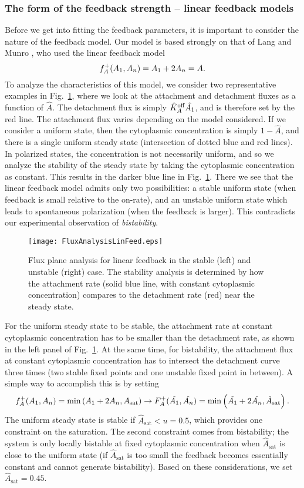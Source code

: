 \documentclass[11pt]{article}
\newcommand{\6}[1]{#1_{\text{6}}}
\newcommand{\3}[1]{#1_{\text{3}}}
\begin{document}
\subsubsection{The form of the feedback strength -- linear feedback models}
Before we get into fitting the feedback parameters, it is important to consider the nature of the feedback model. Our model is based strongly on that of Lang and Munro \cite{lang2022oligomerization}, who used the linear feedback model $$f_A^+(A_1,A_n)=A_1+2A_n=A.$$ 
To analyze the characteristics of this model, we consider two representative examples in Fig.\ \ref{fig:P3Linear}, where we look at the attachment and detachment fluxes as a function of $\hat A$. The detachment flux is simply $\hat{K}^\text{off}_A \hat {A_1}$, and is therefore set by the red line. The attachment flux varies depending on the model considered. If we consider a uniform state, then the cytoplasmic concentration is simply $1-\hat A$, and there is a single uniform steady state (intersection of dotted blue and red lines). In polarized states, the concentration is not necessarily uniform, and so we analyze the stability of the steady state by taking the cytoplasmic concentration as constant. This results in the darker blue line in Fig.\ \ref{fig:P3Linear}. There we see that the linear feedback model admits only two possibilities: a stable uniform state (when feedback is small relative to the on-rate), and an unstable uniform state which leads to spontaneous polarization (when the feedback is larger). This contradicts our experimental observation of \emph{bistability}.

\begin{figure}
\centering
\texttt{[image: FluxAnalysisLinFeed.eps]}
\caption{\label{fig:P3Linear}Flux plane analysis for linear feedback in the stable (left) and unstable (right) case. The stability analysis is determined by how the attachment rate (solid blue line, with constant cytoplasmic concentration) compares to the detachment rate (red) near the steady state.}
\end{figure}

For the uniform steady state to be stable, the attachment rate at constant cytoplasmic concentration has to be smaller than the detachment rate, as shown in the left panel of Fig.\ \ref{fig:P3Linear}. At the same time, for bistability, the attachment flux at constant cytoplasmic concentration has to intersect the detachment curve three times (two stable fixed points and one unstable fixed point in between). A simple way to accomplish this is by setting
\begin{equation}
f_A^+(A_1,A_n) =\min\left(A_1+2A_n,A_\text{sat}\right) \rightarrow F_A^+(\hat {A_1}, \hat {A_n}) = \min\left(\hat {A_1}+2\hat {A_n}, \hat A_\text{sat}\right). 
\end{equation}
The uniform steady state is stable if $\hat A_\text{sat} < u = 0.5$, which provides one constraint on the saturation. The second constraint comes from bistability; the system is only locally bistable at fixed cytoplasmic concentration when $\hat A_\text{sat}$ is close to the uniform state (if $\hat A_\text{sat}$ is too small the feedback becomes essentially constant and cannot generate bistability). Based on these considerations, we set $\hat A_\text{sat}=0.45$. 
\end{document}

